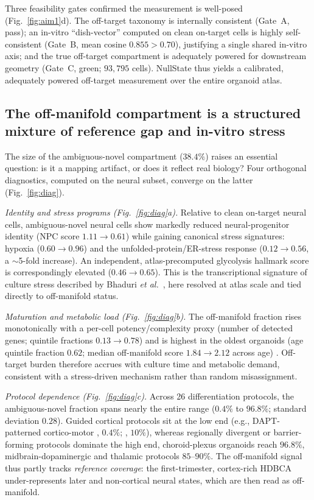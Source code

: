 \documentclass[11pt]{article}
\begin{document}
Three feasibility gates confirmed the measurement is well-posed (Fig.~\ref{fig:aim1}d). The off-target
taxonomy is internally consistent (Gate~A, pass); an in-vitro ``dish-vector'' computed on clean
on-target cells is highly self-consistent (Gate~B, mean cosine $0.855>0.70$), justifying a single
shared in-vitro axis; and the true off-target compartment is adequately powered for downstream geometry
(Gate~C, green; $93{,}795$ cells). NullState thus yields a calibrated, adequately powered off-target
measurement over the entire organoid atlas.

\subsection{The off-manifold compartment is a structured mixture of reference gap and in-vitro stress}
The size of the ambiguous-novel compartment ($38.4\%$) raises an essential question: is it a mapping
artifact, or does it reflect real biology? Four orthogonal diagnostics, computed on the neural subset,
converge on the latter (Fig.~\ref{fig:diag}).

\emph{Identity and stress programs (Fig.~\ref{fig:diag}a).} Relative to clean on-target neural cells,
ambiguous-novel neural cells show markedly reduced neural-progenitor identity (NPC score
$1.11\rightarrow0.61$) while gaining canonical stress signatures: hypoxia
($0.60\rightarrow0.96$) \citep{buffa2010hypoxia} and the unfolded-protein/ER-stress response
($0.12\rightarrow0.56$, a $\sim$5-fold increase). An independent, atlas-precomputed glycolysis hallmark
score is correspondingly elevated ($0.46\rightarrow0.65$). This is the transcriptional signature of
culture stress described by Bhaduri \emph{et al.}\ \citep{bhaduri2020stress}, here resolved at atlas
scale and tied directly to off-manifold status.

\emph{Maturation and metabolic load (Fig.~\ref{fig:diag}b).} The off-manifold fraction rises
monotonically with a per-cell potency/complexity proxy (number of detected genes; quintile fractions
$0.13\rightarrow0.78$) and is highest in the oldest organoids (age quintile fraction $0.62$;
median off-manifold score $1.84\rightarrow2.12$ across age) \citep{gulati2020cytotrace}. Off-target
burden therefore accrues with culture time and metabolic demand, consistent with a stress-driven
mechanism rather than random misassignment.

\emph{Protocol dependence (Fig.~\ref{fig:diag}c).} Across 26 differentiation protocols, the
ambiguous-novel fraction spans nearly the entire range ($0.4\%$ to $96.8\%$; standard deviation
$0.28$). Guided cortical protocols sit at the low end (e.g., DAPT-patterned cortico-motor
\citep{andersen2020corticomotor}, $0.4\%$; \citep{pasca2015cortical}, $10\%$), whereas
regionally divergent or barrier-forming protocols dominate the high end, choroid-plexus organoids
\citep{pellegrini2020csf} reach $96.8\%$, midbrain-dopaminergic \citep{fiorenzano2021midbrain} and
thalamic \citep{xiang2019thalamic} protocols $85$--$90\%$. The off-manifold signal thus partly tracks
\emph{reference coverage}: the first-trimester, cortex-rich HDBCA under-represents later and
non-cortical neural states, which are then read as off-manifold.
\end{document}
